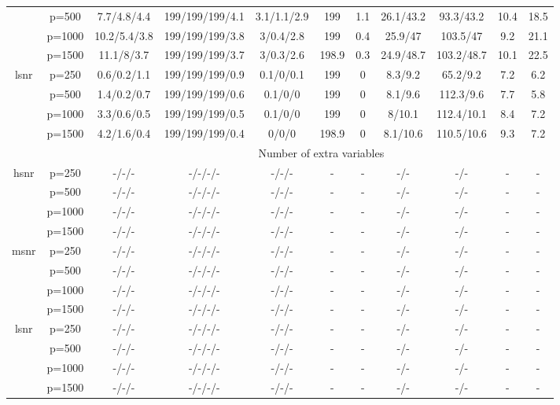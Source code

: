 \begin{table}[ht]
{\begin{tabular}{|c|c|ccccccccc|}
   & p=500 & 7.7/4.8/4.4 & 199/199/199/4.1 & 3.1/1.1/2.9 & 199 & 1.1 & 26.1/43.2 & 93.3/43.2 & 10.4 & 18.5 \\ 
   & p=1000 & 10.2/5.4/3.8 & 199/199/199/3.8 & 3/0.4/2.8 & 199 & 0.4 & 25.9/47 & 103.5/47 & 9.2 & 21.1 \\ 
   & p=1500 & 11.1/8/3.7 & 199/199/199/3.7 & 3/0.3/2.6 & 198.9 & 0.3 & 24.9/48.7 & 103.2/48.7 & 10.1 & 22.5 \\ 
  \midrule\multirow{4}[2]{*}{lsnr} & p=250 & 0.6/0.2/1.1 & 199/199/199/0.9 & 0.1/0/0.1 & 199 & 0 & 8.3/9.2 & 65.2/9.2 & 7.2 & 6.2 \\ 
   & p=500 & 1.4/0.2/0.7 & 199/199/199/0.6 & 0.1/0/0 & 199 & 0 & 8.1/9.6 & 112.3/9.6 & 7.7 & 5.8 \\ 
   & p=1000 & 3.3/0.6/0.5 & 199/199/199/0.5 & 0.1/0/0 & 199 & 0 & 8/10.1 & 112.4/10.1 & 8.4 & 7.2 \\ 
   & p=1500 & 4.2/1.6/0.4 & 199/199/199/0.4 & 0/0/0 & 198.9 & 0 & 8.1/10.6 & 110.5/10.6 & 9.3 & 7.2 \\ 
   \midrule 
 \multicolumn{1}{|c}{} &       & \multicolumn{9}{c|}{Number of extra variables} \\
\midrule\multirow{4}[2]{*}{hsnr} & p=250 & -/-/- & -/-/-/- & -/-/- & - & - & -/- & -/- & - & - \\ 
   & p=500 & -/-/- & -/-/-/- & -/-/- & - & - & -/- & -/- & - & - \\ 
   & p=1000 & -/-/- & -/-/-/- & -/-/- & - & - & -/- & -/- & - & - \\ 
   & p=1500 & -/-/- & -/-/-/- & -/-/- & - & - & -/- & -/- & - & - \\ 
  \midrule\multirow{4}[2]{*}{msnr} & p=250 & -/-/- & -/-/-/- & -/-/- & - & - & -/- & -/- & - & - \\ 
   & p=500 & -/-/- & -/-/-/- & -/-/- & - & - & -/- & -/- & - & - \\ 
   & p=1000 & -/-/- & -/-/-/- & -/-/- & - & - & -/- & -/- & - & - \\ 
   & p=1500 & -/-/- & -/-/-/- & -/-/- & - & - & -/- & -/- & - & - \\ 
  \midrule\multirow{4}[2]{*}{lsnr} & p=250 & -/-/- & -/-/-/- & -/-/- & - & - & -/- & -/- & - & - \\ 
   & p=500 & -/-/- & -/-/-/- & -/-/- & - & - & -/- & -/- & - & - \\ 
   & p=1000 & -/-/- & -/-/-/- & -/-/- & - & - & -/- & -/- & - & - \\ 
   & p=1500 & -/-/- & -/-/-/- & -/-/- & - & - & -/- & -/- & - & - \\ 
   \bottomrule 
\end{tabular}
}
\end{table}
